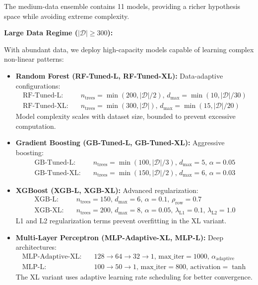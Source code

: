 \documentclass[conference]{IEEEtran}
\begin{document}
The medium-data ensemble contains 11 models, providing a richer hypothesis space while avoiding extreme complexity.

\textbf{Large Data Regime ($|\mathcal{D}| \geq 300$):}

With abundant data, we deploy high-capacity models capable of learning complex non-linear patterns:

\begin{itemize}
    \item \textbf{Random Forest (RF-Tuned-L, RF-Tuned-XL):} Data-adaptive configurations:
    \begin{align}
    \text{RF-Tuned-L:} \quad & n_{\text{trees}} = \min(200, |\mathcal{D}|/2), \, d_{\max} = \min(10, |\mathcal{D}|/30) \\
    \text{RF-Tuned-XL:} \quad & n_{\text{trees}} = \min(300, |\mathcal{D}|), \, d_{\max} = \min(15, |\mathcal{D}|/20)
    \end{align}
    Model complexity scales with dataset size, bounded to prevent excessive computation.
    
    \item \textbf{Gradient Boosting (GB-Tuned-L, GB-Tuned-XL):} Aggressive boosting:
    \begin{align}
    \text{GB-Tuned-L:} \quad & n_{\text{trees}} = \min(100, |\mathcal{D}|/3), \, d_{\max} = 5, \, \alpha = 0.05 \\
    \text{GB-Tuned-XL:} \quad & n_{\text{trees}} = \min(150, |\mathcal{D}|/2), \, d_{\max} = 6, \, \alpha = 0.03
    \end{align}
    
    \item \textbf{XGBoost (XGB-L, XGB-XL):} Advanced regularization:
    \begin{align}
    \text{XGB-L:} \quad & n_{\text{trees}} = 150, \, d_{\max} = 6, \, \alpha = 0.1, \, \rho_{\text{row}} = 0.7 \\
    \text{XGB-XL:} \quad & n_{\text{trees}} = 200, \, d_{\max} = 8, \, \alpha = 0.05, \, \lambda_{\text{L1}} = 0.1, \, \lambda_{\text{L2}} = 1.0
    \end{align}
    L1 and L2 regularization terms prevent overfitting in the XL variant.
    
    \item \textbf{Multi-Layer Perceptron (MLP-Adaptive-XL, MLP-L):} Deep architectures:
    \begin{align}
    \text{MLP-Adaptive-XL:} \quad & 128 \to 64 \to 32 \to 1, \, \text{max\_iter} = 1000, \, \alpha_{\text{adaptive}} \\
    \text{MLP-L:} \quad & 100 \to 50 \to 1, \, \text{max\_iter} = 800, \, \text{activation} = \tanh
    \end{align}
    The XL variant uses adaptive learning rate scheduling for better convergence.
    

\end{itemize}
\end{document}
